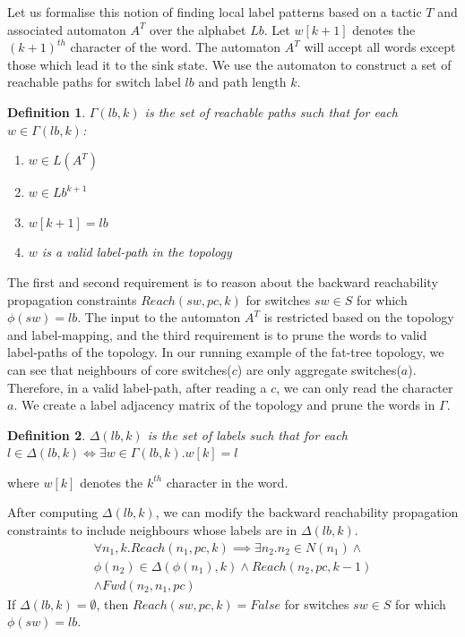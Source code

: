 \documentclass[]{sig}
\newtheorem{mydef}{Definition}
\begin{document}
Let us formalise this notion of finding local label patterns based on a tactic $T$ and associated automaton $A^T$ over the alphabet $Lb$. Let $w[k+1]$ denotes the $(k + 1)^{th}$ character of the word. The automaton $A^T$ will accept all words except those which lead it to the sink state. We use the automaton to construct a set of reachable paths for switch label $lb$ and path length $k$. 
\begin{mydef}
	$\Gamma(lb, k)$ is the set of reachable paths such that for each $w \in \Gamma(lb, k)$: 
	\begin{enumerate}
		\item $w \in L(A^T)$
		\item $w \in Lb^{k+1}$
		\item $w[k+1] = lb$
		\item $w$ is a valid label-path in the topology
	\end{enumerate}
\end{mydef}
The first and second requirement is to reason about the backward reachability propagation constraints \newline $Reach(sw, pc, k)$ for switches $sw \in S$ for which $\phi(sw) = lb$. The input to the automaton $A^T$ is restricted based on the topology and label-mapping, and the third requirement is to prune the words to valid label-paths of the topology. In our running example of the fat-tree topology, we can see that neighbours of core switches($c$) are only aggregate switches($a$). Therefore, in a valid label-path, after reading a $c$, we can only read the character $a$. We create a label adjacency matrix of the topology and prune the words in $\Gamma$. 
\begin{mydef} 
	$\Delta(lb, k)$ is the set of labels such that for each $l \in \Delta(lb, k) \iff \exists w \in \Gamma(lb, k).  w[k] = l$ 
\end{mydef}
where $w[k]$ denotes the $k^{th}$ character in the word. 

After computing $\Delta(lb, k)$, we can modify the backward reachability propagation constraints to include neighbours whose labels are in  $\Delta(lb, k)$. 
\begin{multline}
\forall n_1,k.  Reach(n_1,pc,k) \implies \exists n_2.  n_2 \in N(n_1) \wedge \\ \phi(n_2) \in 
\Delta(\phi(n_1), k) \wedge Reach(n_2,pc,k-1) \\ \wedge Fwd(n_2,n_1,pc)
\end{multline} 
If $\Delta(lb, k) = \emptyset$, then $Reach(sw, pc, k) = False$ for switches $sw \in S$ for which $\phi(sw) = lb$. 
\end{document}
